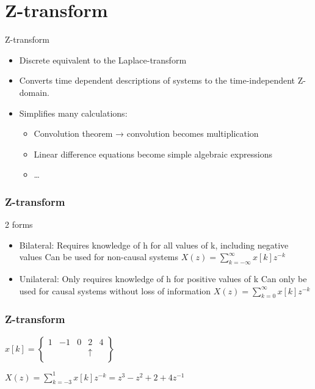 \section{Z-transform}
\begin{frame}{Z-transform}
	\begin{definition}
		\begin{itemize}
			\item Discrete equivalent to the Laplace-transform
			\item Converts time dependent descriptions of systems to the time-independent Z-domain.
			\item Simplifies many calculations:
			\begin{itemize}
				\item 	Convolution theorem → convolution becomes multiplication
				\item Linear difference equations become simple algebraic expressions
				\item \dots
			\end{itemize}
		\end{itemize}
	
		
	\end{definition}
		
\end{frame}
\begin{frame}
	\frametitle{Z-transform}
	\begin{block}{2 forms}
			\begin{itemize}
				
				\item Bilateral:
				Requires knowledge of h for all values of k, including negative values
				Can be used for non-causal systems $X(z) = \sum\limits_{k=-\infty}^{\infty} x[k]z^{-k}$
				\item 	Unilateral:
				Only requires knowledge of h for positive values of k
				Can only be used for causal systems without loss of information $X(z) = \sum\limits_{k=0}^{\infty} x[k]z^{-k}$
			\end{itemize}
	\end{block}


\end{frame}
\begin{frame}
	\frametitle{Z-transform}
		\begin{example}
			\begin{center}
				
				$x[k] = \begin{Bmatrix}
				1 & - 1 & 0 & 2 & 4\\
				&     &   & \uparrow & \\
				\end{Bmatrix}$
			\end{center}
			\begin{center}
				$X(z) = \sum\limits_{k=-3}^{1}x[k]z^{-k} = z^3 -z^2 +2 + 4z^{-1}$
			\end{center}
		\end{example}	
\end{frame}
